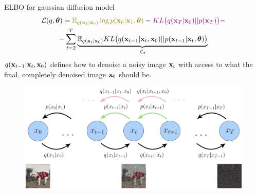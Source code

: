 \begin{frame}{ELBO for gaussian diffusion model}
	\vspace{-0.5cm}
	\begin{multline*}
		\cL(q, \btheta) =  {\color{olive}\bbE_{q(\bx_1 | \bx_0)} \log p(\bx_0 | \bx_1, \btheta)} - {\color{violet}KL\bigl(q(\bx_T | \bx_0) || p(\bx_T)\bigr)} - \\
		- \sum_{t=2}^T \underbrace{ \bbE_{q(\bx_t | \bx_0)} KL \bigl(q(\bx_{t-1} | \bx_t, \bx_0) || p(\bx_{t - 1} | \bx_t, \btheta )\bigr)}_{\cL_t}
	\end{multline*}
	$q(\mathbf{x}_{t-1} | \mathbf{x}_t, \mathbf{x}_0)$ defines how to denoise a noisy image $\mathbf{x}_t$ with access to what the final, completely denoised image $\mathbf{x}_0$ should be.
	
	\begin{figure}
		\includegraphics[width=0.85\linewidth]{figs/diffusion_objective}
	\end{figure}

\end{frame}
